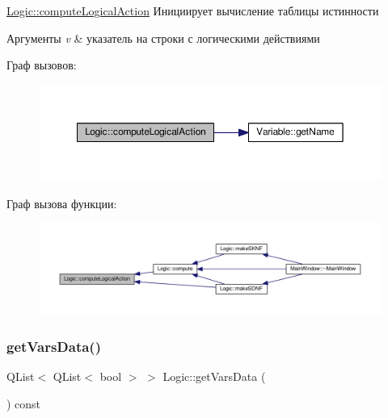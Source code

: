 \hyperlink{class_logic_a7eae2f1ccdc24932e795b33906b501b7}{Logic\+::compute\+Logical\+Action} Инициирует вычисление таблицы истинности 


\begin{DoxyParams}{Аргументы}
{\em v} & указатель на строки с логическими действиями \\
\hline
\end{DoxyParams}
Граф вызовов\+:\nopagebreak
\begin{figure}[H]
\begin{center}
\leavevmode
\includegraphics[width=350pt]{class_logic_a7eae2f1ccdc24932e795b33906b501b7_cgraph}
\end{center}
\end{figure}
Граф вызова функции\+:\nopagebreak
\begin{figure}[H]
\begin{center}
\leavevmode
\includegraphics[width=350pt]{class_logic_a7eae2f1ccdc24932e795b33906b501b7_icgraph}
\end{center}
\end{figure}
\mbox{\label{class_logic_a42630bbe8bded25027014e9f0b2a085e}} 
\subsubsection{\texorpdfstring{get\+Vars\+Data()}{getVarsData()}}
{\footnotesize\ttfamily Q\+List$<$ Q\+List$<$ bool $>$ $>$ Logic\+::get\+Vars\+Data (\begin{DoxyParamCaption}{ }\end{DoxyParamCaption}) const}



